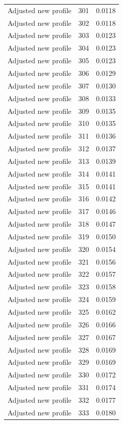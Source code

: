 \begin{table}[htbp]
\begin{tabular}{lll}
Adjusted new profile & 301 & 0.0118 \\
Adjusted new profile & 302 & 0.0118 \\
Adjusted new profile & 303 & 0.0123 \\
Adjusted new profile & 304 & 0.0123 \\
Adjusted new profile & 305 & 0.0123 \\
Adjusted new profile & 306 & 0.0129 \\
Adjusted new profile & 307 & 0.0130 \\
Adjusted new profile & 308 & 0.0133 \\
Adjusted new profile & 309 & 0.0135 \\
Adjusted new profile & 310 & 0.0135 \\
Adjusted new profile & 311 & 0.0136 \\
Adjusted new profile & 312 & 0.0137 \\
Adjusted new profile & 313 & 0.0139 \\
Adjusted new profile & 314 & 0.0141 \\
Adjusted new profile & 315 & 0.0141 \\
Adjusted new profile & 316 & 0.0142 \\
Adjusted new profile & 317 & 0.0146 \\
Adjusted new profile & 318 & 0.0147 \\
Adjusted new profile & 319 & 0.0150 \\
Adjusted new profile & 320 & 0.0154 \\
Adjusted new profile & 321 & 0.0156 \\
Adjusted new profile & 322 & 0.0157 \\
Adjusted new profile & 323 & 0.0158 \\
Adjusted new profile & 324 & 0.0159 \\
Adjusted new profile & 325 & 0.0162 \\
Adjusted new profile & 326 & 0.0166 \\
Adjusted new profile & 327 & 0.0167 \\
Adjusted new profile & 328 & 0.0169 \\
Adjusted new profile & 329 & 0.0169 \\
Adjusted new profile & 330 & 0.0172 \\
Adjusted new profile & 331 & 0.0174 \\
Adjusted new profile & 332 & 0.0177 \\
Adjusted new profile & 333 & 0.0180 \\

\end{tabular}
\end{table}
